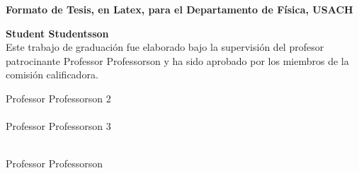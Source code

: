 \thispagestyle{empty}
\begin{center}

\vspace*{1.5cm}
\LARGE{\bf{Formato de Tesis, en Latex, para el Departamento de Física, USACH}} \par

\vspace*{2.5cm}

{\large\bf Student Studentsson}\\[1.0cm]

\vspace*{1.0cm}
\normalsize
Este trabajo de graduación fue elaborado bajo la supervisión del profesor
patrocinante Professor Professorson y ha sido aprobado por los miembros de la
comisión calificadora.
\end{center}

\vspace*{2.5cm}


\begin{flushright}
\begin{minipage}{8.8cm}
Professor Professorson 2 \hrulefill \\ \\
Professor Professorson 3 \hrulefill
\end{minipage}
\end{flushright}

\vspace*{4cm}

\begin{flushleft}
\begin{minipage}{7.5cm}
  \centering
  \hrulefill\\
  Professor Professorson \\
\end{minipage}
\end{flushleft}


